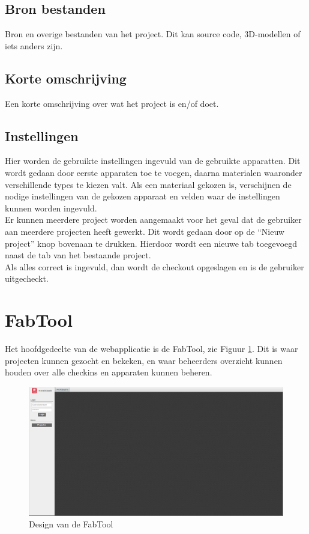 \subsection{Bron bestanden}

Bron en overige bestanden van het project. Dit kan source code, 3D-modellen of iets anders zijn.

\subsection{Korte omschrijving}

Een korte omschrijving over wat het project is en/of doet.

\subsection{Instellingen}

Hier worden de gebruikte instellingen ingevuld van de gebruikte apparatten. Dit wordt gedaan door eerste apparaten toe te voegen, daarna materialen waaronder verschillende types te kiezen valt. Als een materiaal gekozen is, verschijnen de nodige instellingen van de gekozen apparaat en velden waar de instellingen kunnen worden ingevuld. \\

Er kunnen meerdere project worden aangemaakt voor het geval dat de gebruiker aan meerdere projecten heeft gewerkt. Dit wordt gedaan door op de ``Nieuw project'' knop bovenaan te drukken. Hierdoor wordt een nieuwe tab toegevoegd naast de tab van het bestaande project. \\
Als alles correct is ingevuld, dan wordt de checkout opgeslagen en is de gebruiker uitgecheckt.

\section{FabTool}

Het hoofdgedeelte van de webapplicatie is de FabTool, zie Figuur \ref{fig:fabtool}. Dit is waar projecten kunnen gezocht en bekeken, en waar beheerders overzicht kunnen houden over alle checkins en apparaten kunnen beheren.

\begin{figure}[Hh]
	\centering
	\includegraphics[width=1\textwidth]{Images/fabtool.png}
	\caption{Design van de FabTool}
	\label{fig:fabtool}
\end{figure}

